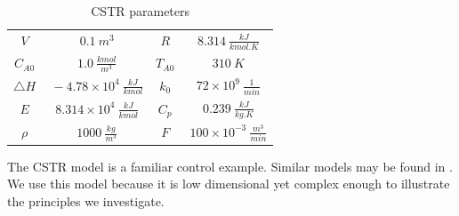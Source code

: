 \documentclass[../masters.tex]{subfiles}
\begin{document}
\begin{table}[H]
\begin{center}
\begin{tabular}{c c c c}
\hline
$V$ & $~0.1~m^3$ & $R$ & $~8.314~\frac{kJ}{kmol.K}$ \\
$C_{A0}$ & $~1.0~\frac{kmol}{m^3}$ &$T_{A0}$ & $~310~K$ \\
$\triangle H$ & $~-4.78\times 10^{4}~\frac{kJ}{kmol}$ & $k_{0}$ & $~72\times 10^{9}~\frac{1}{min}$ \\
$E$ & $~8.314\times 10^4~\frac{kJ}{kmol}$ & $C_{p}$ & $~0.239~\frac{kJ}{kg.K}$ \\
$\rho$ & $~1000~\frac{kg}{m^3}$ & 
$F$ & $~100\times 10^{-3}~\frac{m^3}{min}$ \\
\hline
\end{tabular}
\caption{CSTR parameters}
\label{tab_params}
\end{center}
\end{table}
The CSTR model is a familiar control example. Similar models may be found in \cite{du}\cite{cervantes}\cite{pan}\cite{yazdi}. We use this model because it is low dimensional yet complex enough to illustrate the principles we investigate.  
\end{document}
